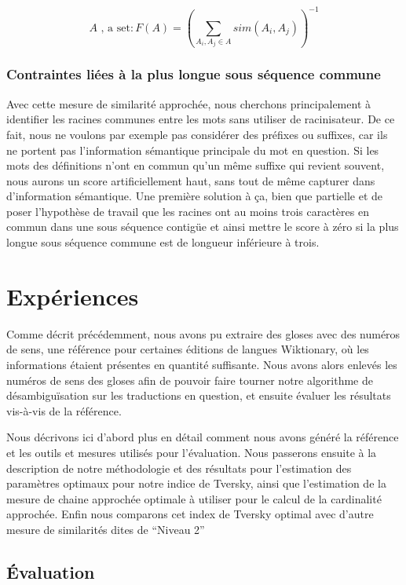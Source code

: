 \documentclass[10pt,a4paper,twoside]{article}
\begin{document}
\[
	A \mbox{ , a set} : F(A) = (\sum_{A_i,A_j \in A}sim(A_i, A_j))^{-1}
\]


\subsubsection{Contraintes liées à la plus longue sous séquence commune}
Avec cette mesure de similarité approchée, nous cherchons principalement à identifier les racines communes entre les mots sans utiliser de racinisateur. De ce fait, nous ne voulons par exemple pas considérer des préfixes ou suffixes, car ils ne portent pas l'information sémantique principale du mot en question. Si les mots des définitions n'ont en commun qu'un même suffixe qui revient souvent, nous aurons un score artificiellement haut, sans tout de même capturer dans d'information sémantique. Une première solution à ça, bien que partielle et de poser l'hypothèse de travail que les racines ont au moins trois caractères en commun dans une sous séquence contigüe et ainsi mettre le score à zéro si la plus longue sous séquence commune est de longueur inférieure à trois.

\section{Expériences}
\label{sec:expe}
Comme décrit précédemment, nous avons pu extraire des gloses avec des numéros de sens, une référence pour certaines éditions de langues Wiktionary, où les informations étaient présentes en quantité suffisante. Nous avons alors enlevés les numéros de sens des gloses afin de pouvoir faire tourner notre algorithme de désambiguïsation sur les traductions en question, et ensuite évaluer les résultats vis-à-vis de la référence.

Nous décrivons ici d'abord plus en détail comment nous avons généré la référence et les outils et mesures utilisés pour l'évaluation. 
Nous passerons ensuite à la description de notre méthodologie et des résultats pour l'estimation des paramètres optimaux pour notre indice de Tversky, ainsi que l'estimation de la mesure de chaine approchée optimale à utiliser pour le calcul de la cardinalité approchée. Enfin nous comparons cet index de Tversky optimal avec d'autre mesure de similarités dites de ``Niveau 2''
 
\subsection{Évaluation}
\end{document}
